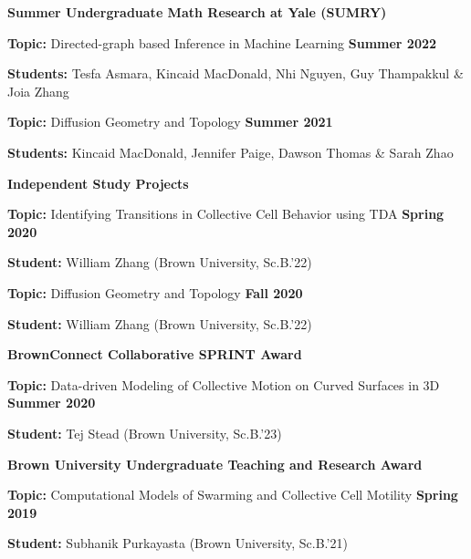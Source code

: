 \documentclass[margin,line]{res}
\newenvironment{list1}{
  \begin{list}{\ding{113}}{
      \setlength{\itemsep}{0in}
      \setlength{\parsep}{0in} \setlength{\parskip}{0in}
      \setlength{\topsep}{0in} \setlength{\partopsep}{0in}
      \setlength{\leftmargin}{0.17in}}}{\end{list}}
\begin{document}
\begin{resume}
{\bf Summer Undergraduate Math Research at Yale (SUMRY)}
\vspace*{.3cm}
\begin{list1}
\setlength\itemsep{0.2em}
\item[] {\bf Topic:} Directed-graph based Inference in Machine Learning \hfill {\bf Summer 2022}
\item[] {\bf Students:} Tesfa Asmara, Kincaid MacDonald, Nhi Nguyen, Guy Thampakkul \& Joia Zhang 
\end{list1}
\vspace*{.3cm}
\begin{list1}
\setlength\itemsep{0.2em}
\item[] {\bf Topic:} Diffusion Geometry and Topology \hfill {\bf Summer 2021}
\item[] {\bf Students:} Kincaid MacDonald, Jennifer Paige, Dawson Thomas \& Sarah Zhao
\end{list1}

{\bf Independent Study Projects}
\vspace*{.3cm}
\begin{list1}
\setlength\itemsep{0.2em}
\item[] {\bf Topic:} Identifying Transitions in Collective Cell Behavior using TDA \hfill {\bf Spring 2020}
\item[] {\bf Student:} William Zhang (Brown University, Sc.B.'22) 
\end{list1}
\vspace*{.3cm}
\begin{list1}
\setlength\itemsep{0.2em}
\item[] {\bf Topic:} Diffusion Geometry and Topology \hfill {\bf Fall 2020}
\item[] {\bf Student:} William Zhang (Brown University, Sc.B.'22)
\end{list1}


{\bf BrownConnect Collaborative SPRINT Award}
\vspace*{.3cm}
\begin{list1}
\setlength\itemsep{0.2em}
\item[] {\bf Topic:} Data-driven Modeling of Collective Motion on Curved Surfaces in 3D \hfill {\bf Summer 2020}
\item[] {\bf Student:} Tej Stead (Brown University, Sc.B.'23)
\end{list1}

{\bf Brown University Undergraduate Teaching and Research Award}
\vspace*{.3cm}
\begin{list1}
\setlength\itemsep{0.2em}
\item[] {\bf Topic:} Computational Models of Swarming and Collective Cell Motility \hfill {\bf Spring 2019}
\item[] {\bf Student:} Subhanik Purkayasta (Brown University, Sc.B.'21)
\end{list1}


\end{resume}
\end{document}
